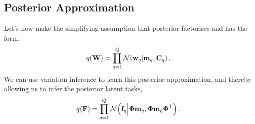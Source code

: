 \subsection{Posterior Approximation}
 Let's now make the simplifying assumption that posterior factorises and has the
form,
\begin{equation}
    q\!\left({\mathbf{W}}\right) = \prod^Q_{q=1} \mathcal{N}\!\left({\mathbf{w}_q}\middle\vert{\ensuremath{\mathbf{m}}_q, \ensuremath{\mathbf{C}}_q}\right),
\end{equation}
We can use variation inference to learn this posterior approximation, and
thereby allowing us to infer the posterior latent tasks,
\begin{equation}
\label{eq:posteriorF}
q(\mathbf{F})  = \prod^Q_{q=1} \mathcal{N}\!\left({\mathbf{f}_q}\middle\vert{\ensuremath{\boldsymbol\Phi}\ensuremath{\mathbf{m}}_q, \ensuremath{\boldsymbol\Phi}\ensuremath{\mathbf{m}}_q  \ensuremath{\boldsymbol\Phi}^T}\right) \text{.}
\end{equation}
